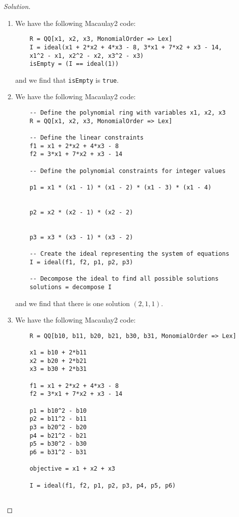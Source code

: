 \documentclass[12pt]{article}
\newenvironment{solution}
    {\renewcommand{\qedsymbol}{}\begin{proof}[Solution]}
    {\end{proof}}
\begin{document}
\begin{solution}
	\begin{enumerate}
		\item We have the following Macaulay2 code:

		      \begin{verbatim}
    R = QQ[x1, x2, x3, MonomialOrder => Lex]
    I = ideal(x1 + 2*x2 + 4*x3 - 8, 3*x1 + 7*x2 + x3 - 14,
    x1^2 - x1, x2^2 - x2, x3^2 - x3)
    isEmpty = (I == ideal(1))
    \end{verbatim}
		      and we find that \texttt{isEmpty} is \texttt{true}.
		\item We have the following Macaulay2 code:

		      \begin{verbatim}
    -- Define the polynomial ring with variables x1, x2, x3
    R = QQ[x1, x2, x3, MonomialOrder => Lex]
    
    -- Define the linear constraints
    f1 = x1 + 2*x2 + 4*x3 - 8
    f2 = 3*x1 + 7*x2 + x3 - 14
    
    -- Define the polynomial constraints for integer values
    
    p1 = x1 * (x1 - 1) * (x1 - 2) * (x1 - 3) * (x1 - 4)
    
    
    p2 = x2 * (x2 - 1) * (x2 - 2)
    
    
    p3 = x3 * (x3 - 1) * (x3 - 2)
    
    -- Create the ideal representing the system of equations
    I = ideal(f1, f2, p1, p2, p3)
    
    -- Decompose the ideal to find all possible solutions
    solutions = decompose I
	\end{verbatim}
		      and we find that there is one solution $(2,1,1)$.

		\item We have the following Macaulay2 code:
		      \begin{verbatim}
    R = QQ[b10, b11, b20, b21, b30, b31, MonomialOrder => Lex]
    
    x1 = b10 + 2*b11
    x2 = b20 + 2*b21
    x3 = b30 + 2*b31
    
    f1 = x1 + 2*x2 + 4*x3 - 8
    f2 = 3*x1 + 7*x2 + x3 - 14
    
    p1 = b10^2 - b10
    p2 = b11^2 - b11
    p3 = b20^2 - b20
    p4 = b21^2 - b21
    p5 = b30^2 - b30
    p6 = b31^2 - b31
    
    objective = x1 + x2 + x3
    
    I = ideal(f1, f2, p1, p2, p3, p4, p5, p6)
    

\end{verbatim}
\end{enumerate}
\end{solution}
\end{document}
